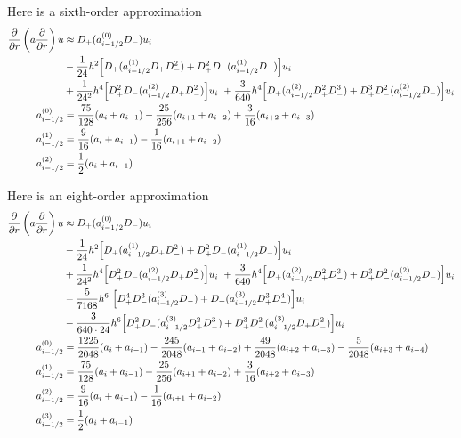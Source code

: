\documentclass[10pt]{article}
\begin{document}
Here is a sixth-order approximation
\begin{align*}
 {\partial \over \partial r}\left( a {\partial \over \partial r}\right) u &\approx
     D_+( a_{i-1/2}^{(0)} D_-) u_i \\
     & - {1\over 24} h^2\Big[ D_+( a_{i-1/2}^{(1)} D_+D_-^2) + D_+^2D_-( a_{i-1/2}^{(1)} D_-) \Big] u_i \\
     & + {1\over 24^2} h^4 \Big[ D_+^2D_-( a_{i-1/2}^{(2)} D_+D_-^2) \Big] u_i
         ~+ {3\over 640} h^4\Big[ D_+( a_{i-1/2}^{(2)} D_+^2D_-^3) + D_+^3D_-^2( a_{i-1/2}^{(2)} D_-) \Big] u_i \\
   a_{i-1/2}^{(0)} &= {75\over128} ( a_{i} + a_{i-1} ) -{25\over256} ( a_{i+1} + a_{i-2} )
                                                 +{3\over16} ( a_{i+2} + a_{i-3} )  \\
   a_{i-1/2}^{(1)} &={9\over16} ( a_{i} + a_{i-1} ) -{1\over16} ( a_{i+1} + a_{i-2} ) \\
   a_{i-1/2}^{(2)} &= {1\over2} ( a_{i} + a_{i-1} )
\end{align*} 

Here is an eight-order approximation
\begin{align*}
 {\partial \over \partial r}\left( a {\partial \over \partial r}\right) u &\approx
D_+( a_{i-1/2}^{(0)} D_-) u_i \\
     & - {1\over 24} h^2\Big[ D_+( a_{i-1/2}^{(1)} D_+D_-^2) + D_+^2D_-( a_{i-1/2}^{(1)} D_-) \Big] u_i \\
     & + {1\over 24^2} h^4 \Big[ D_+^2D_-( a_{i-1/2}^{(2)} D_+D_-^2) \Big] u_i
         ~+ {3\over 640} h^4\Big[ D_+( a_{i-1/2}^{(2)} D_+^2D_-^3) + D_+^3D_-^2( a_{i-1/2}^{(2)} D_-) \Big] u_i \\
     & -{5 \over 7168} h^6~ \Big[ D_+^4D_-^3( a_{i-1/2}^{(3)} D_- ) + D_+( a_{i-1/2}^{(3)} D_+^3D_-^4) \Big] u_i \\
     & -{3\over 640\cdot24} h^6\Big[ D_+^2D_-( a_{i-1/2}^{(3)} D_+^2D_-^3) 
                + D_+^3D_-^2( a_{i-1/2}^{(3)} D_+D_-^2)  \Big] u_i \\
   a_{i-1/2}^{(0)} &= {1225\over2048} ( a_{i} + a_{i-1} ) -{245\over2048} ( a_{i+1} + a_{i-2} )
                 +{49\over2048} ( a_{i+2} + a_{i-3} ) -{5\over2048} ( a_{i+3} + a_{i-4} ) \\
   a_{i-1/2}^{(1)} &= {75\over128} ( a_{i} + a_{i-1} ) -{25\over256} ( a_{i+1} + a_{i-2} )
                                                 +{3\over16} ( a_{i+2} + a_{i-3} )  \\
   a_{i-1/2}^{(2)} &={9\over16} ( a_{i} + a_{i-1} ) -{1\over16} ( a_{i+1} + a_{i-2} ) \\
   a_{i-1/2}^{(3)} &= {1\over2} ( a_{i} + a_{i-1} )
\end{align*} 
\end{document}

